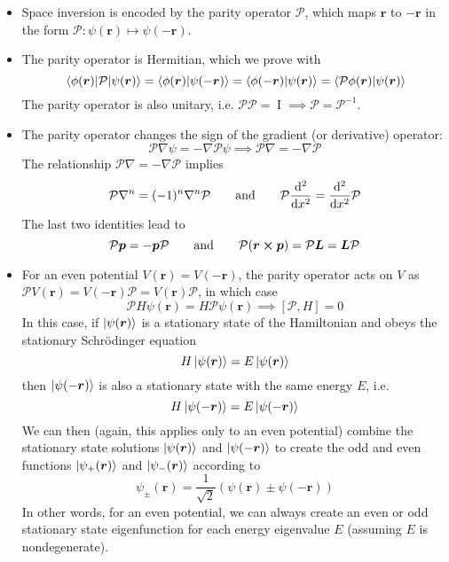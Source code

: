 \documentclass[11pt, a4paper]{article}
\renewcommand{\grad}{\nabla}
\newcommand{\eqtext}[1]{\qquad \text{#1} \qquad}
\newcommand{\Schro}{Schr\"{o}dinger\xspace}
\newcommand{\Ham}{Hamiltonian\xspace}
\newcommand{\Herm}{Hermitian\xspace}
\renewcommand{\vec}[1]{\bm{#1}} %
\renewcommand{\r}{\vec{r}}  %
\newcommand{\II}{\operatorname{I}}  %
\newcommand{\Par}{\mathcal{P}}  %
\newcommand{\p}{\psi}  %
\renewcommand{\k}[1]{\ket{#1}}
\begin{document}
\begin{itemize}
	\item Space inversion is encoded by the parity operator $ \Par $, which maps $ \r $ to $ -\r $ in the form $ \Par:\p(\r) \mapsto \p(-\r) $.
	
	\item The parity operator is \Herm, which we prove with
	\begin{equation*}
		\mel{\phi(\r)}{\Par}{\p(\r)} = \braket{\phi(\r)}{\p(-\r)} = \braket{\phi(-\r)}{\p(\r)} = \braket{\Par \phi(\r)}{\p(\r)}
	\end{equation*}
	The parity operator is also unitary, i.e. $ \Par \Par = \II \implies \Par = \Par^{-1} $.

	\item The parity operator changes the sign of the gradient (or derivative) operator:
	\begin{equation*}
		\Par \grad \p = - \grad \Par \psi \implies \Par \grad = - \grad \Par
	\end{equation*}
	The relationship $ \Par \grad = - \grad \Par $ implies
	\begin{equation*}
		\Par \grad^{n} = (-1)^{n}\grad^{n} \Par \eqtext{and} \Par \dv[2]{}{x} = \dv[2]{}{x} \Par
	\end{equation*}
	The last two identities lead to
	\begin{equation*}
		\Par \vec{p} = - \vec{p} \Par \eqtext{and} \Par (\r \cross \vec{p}) = \Par \vec{L} = \vec{L} \Par 
	\end{equation*}
	
	\item For an even potential $ V(\r) = V(-\r) $, the parity operator acts on $ V $ as $ \Par V(\r) = V(-\r)\Par = V(\r)\Par $, in which case
	\begin{equation*}
		\Par H\p(\r) = H \Par \p(\r) \implies [\Par, H] = 0
	\end{equation*}
	In this case, if $ \ket{\p(\r)} $ is a stationary state of the \Ham and obeys the stationary \Schro equation
	\begin{equation*}
		H\k{\p(\r)} = E \ket{\p(\r)}
	\end{equation*}
	then $ \ket{\p(-\r)} $ is also a stationary state with the same energy $ E $, i.e.
	\begin{equation*}
		H\k{\p(-\r)} = E \ket{\p(-\r)}
	\end{equation*}
	We can then (again, this applies only to an even potential) combine the stationary state solutions $  \ket{\p(\r)} $ and $ \ket{\p(-\r)} $ to create the odd and even functions $  \ket{\p_{+}(\r)} $ and $ \k{\p_{-}(\r)} $ according to
	\begin{equation*}
		\p_{\pm}(\r) = \frac{1}{\sqrt{2}}\left(\p(\r) \pm \p(-\r)\right)
	\end{equation*}
	In other words, for an even potential, we can always create an even or odd stationary state eigenfunction for each energy eigenvalue $ E $ (assuming $ E $ is nondegenerate).
	

\end{itemize}
\end{document}
